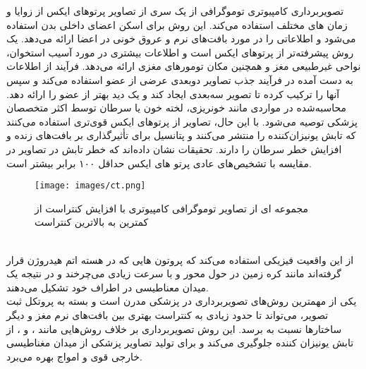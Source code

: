 تصویربرداری کامپیوتری توموگرافی از یک سری از تصاویر پرتوهای ایکس از زوایا و زمان های مختلف استفاده می‌کند. این روش برای اسکن اعضای داخلی بدن استفاده می‌شود و اطلاعاتی را در مورد بافت‌های نرم و عروق خونی در اعضا ارائه می‌دهد.  یک روش پیشرفته‌تر از پرتوهای ایکس است و اطلاعات بیشتری در مورد آسیب استخوان، نواحی غیرطبیعی مغز و همچنین مکان تومورهای مغزی ارائه می‌دهد. فرآیند  از اطلاعات به دست آمده در فرآیند جذب تصاویر دوبعدی عرضی از عضو استفاده می‌کند و سپس آنها را ترکیب کرده تا تصویر سه‌بعدی ایجاد کند و یک دید بهتر از عضو را ارائه دهد.  محاسبه‌شده در مواردی مانند خونریزی، لخته خون یا سرطان توسط اکثر متخصصان پزشکی توصیه می‌شود. با این حال، تصاویر  از پرتوهای ایکس قوی‌تری استفاده می‌کنند که تابش یونیزان‌کننده را منتشر می‌کنند و پتانسیل برای تأثیرگذاری بر بافت‌های زنده و افزایش خطر سرطان را دارند. تحقیقات نشان داده‌اند که خطر تابش در تصاویر  در مقایسه با تشخیص‌های عادی پرتو های ایکس حداقل ۱۰۰ برابر بیشتر است\cite{soomro2022image}.
\\
\begin{figure}[h]
\centerline{\texttt{[image: images/ct.png]}}
\caption[مجموعه ای از تصاویر ]{مجموعه ای از تصاویر توموگرافی کامپیوتری با افزایش کنتراست از کمترین به بالاترین کنتراست\cite{soomro2022image}}
\label{fig:ct}
\end{figure}
\\
 از این واقعیت فیزیکی استفاده می‌کند که پروتون هایی که در هسته اتم هیدروژن قرار گرفته‌اند مانند کره زمین در حول محور و با سرعت زیادی می‌چرخند و در نتیجه یک میدان معناطیسی در اطراف خود تشکیل می‌دهند.
\\
  یکی از مهمترین روش‌های تصویربرداری در پزشکی مدرن است و بسته به پروتکل ثبت تصویر، می‌تواند تا حدود زیادی به کنتراست بهتری بین بافت‌های نرم مغز و دیگر ساختارها نسبت به  برسد. این روش تصویربرداری بر خلاف روش‌هایی مانند ،  و ، از تابش یونیزان کننده جلوگیری می‌کند و برای تولید تصاویر پزشکی از میدان مغناطیسی خارجی قوی و امواج  بهره می‌برد.
\\

